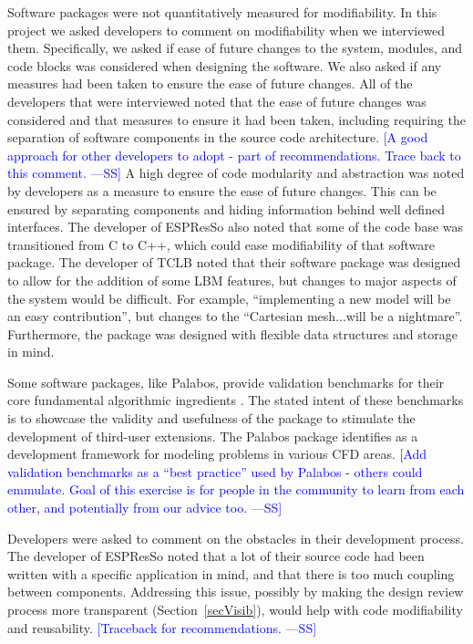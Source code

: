\documentclass[final, 3p, times, authoryear]{elsarticle}
\newcommand{\authornote}[3]{\textcolor{#1}{[#3 ---#2]}}
\newcommand{\authornote}[3]{}
\newcommand{\wss}[1]{\authornote{blue}{SS}{#1}} %
\begin{document}
Software packages were not quantitatively measured for modifiability. In this
project we asked developers to comment on modifiability when we interviewed
them. Specifically, we asked if ease of future changes to the system, modules,
and code blocks was considered when designing the software. We also asked if any
measures had been taken to ensure the ease of future changes. All of the
developers that were interviewed noted that the ease of future changes was
considered and that measures to ensure it had been taken, including requiring
the separation of software components in the source code architecture.  \wss{A
good approach for other developers to adopt - part of recommendations.  Trace
back to this comment.}  A high degree of code modularity and abstraction was
noted by developers as a measure to ensure the ease of future changes. This can
be ensured by separating components and hiding information behind well defined
interfaces. The developer of ESPResSo also noted that some of the code base was
transitioned from C to C++, which could ease modifiability of that software
package. The developer of TCLB noted that their software package was designed to
allow for the addition of some LBM features, but changes to major aspects of the
system would be difficult. For example, ``implementing a new model will be an
easy contribution'', but changes to the ``Cartesian mesh...will be a
nightmare''. Furthermore, the package was designed with flexible data structures
and storage in mind. 

Some software packages, like Palabos, provide validation benchmarks for their
core fundamental algorithmic ingredients \citep{latt2021palabos}. The stated
intent of these benchmarks is to showcase the validity and usefulness of the
package to stimulate the development of third-user extensions. The Palabos
package identifies as a development framework for modeling problems in various
CFD areas.  \wss{Add validation benchmarks as a ``best practice'' used by
Palabos - others could emmulate.  Goal of this exercise is for people in the
community to learn from each other, and potentially from our advice too.}

Developers were asked to comment on the obstacles in their development process.
The developer of ESPResSo noted that a lot of their source code had been written
with a specific application in mind, and that there is too much coupling between
components. Addressing this issue, possibly by making the design review process
more transparent (Section~\ref{secVisib}), would help with code modifiability
and reusability.  \wss{Traceback for recommendations.}
\end{document}
